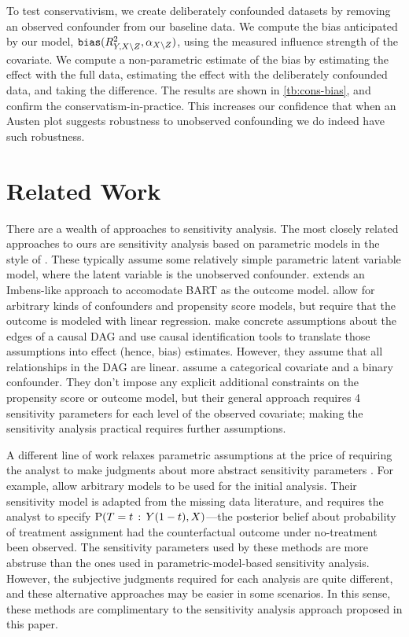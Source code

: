 \documentclass{article}
\begin{document}
To test conservativism, we create deliberately confounded datasets by removing an observed confounder from our baseline data.
We compute the bias anticipated by our model, $\mathtt{bias}(R_{Y,X\backslash Z}^{2},\alpha_{X\backslash Z})$, using the measured influence strength  of the covariate.
We compute a non-parametric estimate of the bias by estimating the effect with the full data,
estimating the effect with the deliberately confounded data, and taking the difference.
The results are shown in \cref{tb:cons-bias}, and confirm the conservatism-in-practice.
This increases our confidence that when an Austen plot suggests robustness to unobserved confounding we
do indeed have such robustness.

\section{Related Work}\label{sec:related-work}
%
There are a wealth of approaches to sensitivity analysis.
%
%
%
The most closely related approaches to ours are sensitivity analysis based on parametric models in the style of \citet{Imbens:2003}.
These typically assume some relatively simple parametric latent variable model, where the latent variable is the unobserved confounder.
\citet{Dorie:Harada:Carnegie:Hill:2016} extends an Imbens-like approach to accomodate BART as the outcome model.
%
%
\citet{Cinelli:Hazlett:2019} allow for arbitrary kinds of confounders and propensity score models, but require
that the outcome is modeled with linear regression.
\citet{Cinelli:Kumor:Chen:Pearl:Bareinboim:2019} make concrete assumptions about the edges of a causal DAG and use causal identification tools to translate those assumptions into effect (hence, bias) estimates. However, they assume that all relationships in the DAG are linear.
\citet{Rosenbaum:Rubin:1983} assume a categorical covariate and a binary confounder. They don't impose any explicit additional constraints on the propensity score or outcome model, but their general approach requires 4 sensitivity parameters for each level of the observed covariate; making the sensitivity analysis practical requires further assumptions.


A different line of work relaxes parametric assumptions at the price of requiring the analyst to
make judgments about more abstract sensitivity parameters \citep[e.g.,][]{Franks:Damour:Feller:2019,Shen:Li:Li:Were:2011,VanderWeele:Arah:2011,Ding:VanderWeele:2015}.
For example, \citet{Franks:Damour:Feller:2019} allow arbitrary models to be used for the initial analysis. Their sensitivity model is adapted from the missing data literature, and requires the analyst to specify $\Pr(T=t \given Y(1-t), X)$---the posterior belief about probability of treatment assignment had the counterfactual outcome under no-treatment been observed.
The sensitivity parameters used by these methods are more abstruse than the ones used in parametric-model-based sensitivity analysis. However, the subjective judgments required for each analysis are quite different, and these alternative approaches may be easier in some scenarios. In this sense, these methods are complimentary to the sensitivity analysis approach proposed in this paper.
%
%
%
%
%
\end{document}

